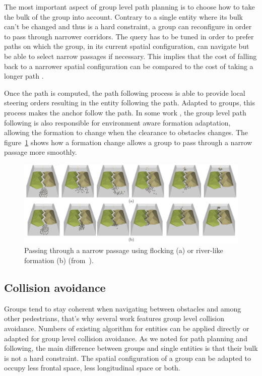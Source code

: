 \documentclass[a4paper,titlepage]{article}
\begin{document}
The most important aspect of group level path planning is to choose how to take the bulk of the group into account.  Contrary to a single entity where its bulk can’t be changed and thus is a hard constraint, a group can reconfigure in order to pass through narrower corridors. The query has to be tuned in order to prefer paths on which the group, in its current spatial configuration, can navigate but be able to select narrow passages if necessary. This implies that the cost of falling back to a narrower spatial configuration can be compared to the cost of taking a longer path \cite{Kamphuis:2004ct,Pottinger:1999vk,Bayazit:2003up}.

Once the path is computed, the path following process is able to provide local steering orders resulting in the entity following the path. Adapted to groups, this process makes the anchor follow the path. In some work \cite{Bayazit:2003up,Pottinger:1999vk}, the group level path following is also responsible for environment aware formation adaptation, allowing the formation to change when the clearance to obstacles changes. The figure~\ref{fig:narrow_passage} shows how a formation change allows a group to pass through a narrow passage more smoothly.

\begin{figure}[h]
\centering
\includegraphics[width=\textwidth]{NarrowPassage.jpg}
\caption{Passing through a narrow passage using flocking (a) or river-like formation (b) (from~\cite{Bayazit:2003up}).}
\label{fig:narrow_passage}
\end{figure} 

\subsection{Collision avoidance}
\label{sec:who_s_in_charge:collision_avoidance}

Groups tend to stay coherent when navigating between obstacles and among other pedestrians, that’s why several work features group level collision avoidance. Numbers of existing algorithm for entities can be applied directly or adapted for group level collision avoidance. As we noted for path planning and following, the main difference between groups and single entities is that their bulk is not a hard constraint. The spatial configuration of a group can be adapted to occupy less frontal space, less longitudinal space or both. 
\end{document}
